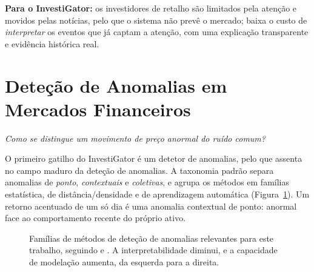 \textbf{Para o InvestiGator:} os investidores de retalho são limitados pela atenção e movidos pelas
notícias, pelo que o sistema não prevê o mercado; baixa o custo de \emph{interpretar} os eventos que já
captam a atenção, com uma explicação transparente e evidência histórica real.

\section{Deteção de Anomalias em Mercados Financeiros}
\label{sec:sota_anomaly}

\emph{Como se distingue um movimento de preço anormal do ruído comum?}

O primeiro gatilho do InvestiGator é um detetor de anomalias, pelo que assenta no campo maduro da deteção
de anomalias. A taxonomia padrão \autocite{chandola2009anomaly} separa anomalias de \emph{ponto},
\emph{contextuais} e \emph{coletivas}, e agrupa os métodos em famílias estatística, de distância/densidade
e de aprendizagem automática (Figura~\ref{fig:sota_anomaly_taxonomy}). Um retorno acentuado de um só dia é
uma anomalia contextual de ponto: anormal face ao comportamento recente do próprio ativo.

\begin{figure}[ht]
\centering
{}
\caption[Taxonomia dos métodos de deteção de anomalias]{Famílias de métodos de deteção de anomalias
relevantes para este trabalho, seguindo \textcite{chandola2009anomaly} e \textcite{pang2021deep}. A
interpretabilidade diminui, e a capacidade de modelação aumenta, da esquerda para a direita.}
\label{fig:sota_anomaly_taxonomy}
\end{figure}


